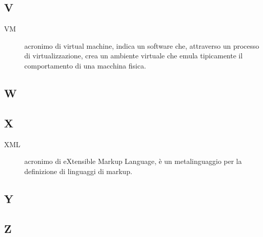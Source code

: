 \documentclass[../../../manuale.sviluppatore.tex]{subfiles}
\begin{document}
\subsection{V}

\begin{description}
    \item[VM] acronimo di virtual machine, indica un software che, attraverso un processo di virtualizzazione, crea un ambiente virtuale che emula tipicamente il comportamento di una macchina fisica.
\end{description}

\subsection{W}

\subsection{X}
\begin{description}
    \item[XML] acronimo di eXtensible Markup Language, è un metalinguaggio per la definizione di linguaggi di markup.
\end{description}

\subsection{Y}

\subsection{Z}
\end{document}
